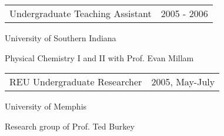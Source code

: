 \documentclass[10pt]{article}
\newenvironment{outerlist}[1][\enskip\textbullet]%
        {\begin{itemize}[#1]}{\end{itemize}%
         \vspace{-.6\baselineskip}}
\newenvironment{innerlist}[1][\enskip\textbullet]%
        {\begin{compactitem}[#1]}{\end{compactitem}}
\newcommand{\blankline}{\quad\pagebreak[2]}
\begin{document}
\begin{tabular}{p{240pt} l}
Undergraduate Teaching Assistant  & 2005 - 2006
\end{tabular}
\begin{innerlist}
\item[\hspace*{20pt}] University of Southern Indiana
\item[\hspace*{20pt}] Physical Chemistry I and II with Prof. Evan Millam\\
\end{innerlist}
%
\vspace{-8pt}

\begin{tabular}{p{240pt} l}
REU Undergraduate Researcher  & 2005, May-July 
\end{tabular}
\begin{innerlist}
\item[\hspace*{20pt}] University of Memphis
\item[\hspace*{20pt}] Research group of Prof. Ted Burkey\\
\end{innerlist}


\blankline
\end{document}
